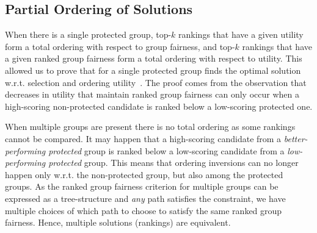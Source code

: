 \subsection{Partial Ordering of Solutions}
\label{sec:algo:partialOrdering}
When there is a single protected group,
top-$k$ rankings that have a given utility form a total ordering with respect to group fairness, and
top-$k$ rankings that have a given ranked group fairness form a total ordering with respect to utility.
%
This allowed us to prove that \algoFAIR for a single protected group finds the optimal solution w.r.t. selection and ordering utility~\cite{zehlike2017fair}.
%
The proof comes from the observation that decreases in utility that maintain ranked group fairness can only occur when a high-scoring non-protected candidate is ranked below a low-scoring protected one.%
%

When multiple groups are present there is no total ordering as some rankings cannot be compared.
%
It may happen that a high-scoring candidate from a \emph{better-performing protected} group is ranked below a low-scoring candidate from a \emph{low-performing protected} group.
%
This means that ordering inversions can no longer happen only w.r.t. the non-protected group, but also among the protected groups.
%
As the ranked group fairness criterion for multiple groups can be expressed as a tree-structure and \emph{any} path satisfies the constraint, we have multiple choices of which path to choose to satisfy the same ranked group fairness.
%
Hence, multiple solutions (rankings) are equivalent.
%

